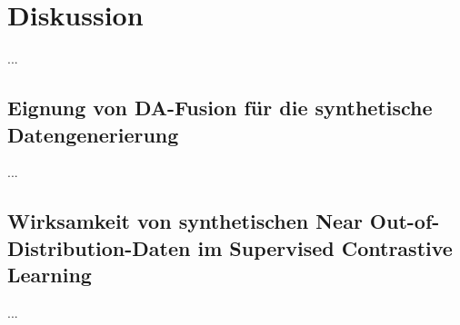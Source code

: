 \chapter{Diskussion}

...


\section{Eignung von DA-Fusion für die synthetische Datengenerierung}

...

\section{Wirksamkeit von synthetischen Near Out-of-Distribution-Daten im Supervised Contrastive Learning}

...